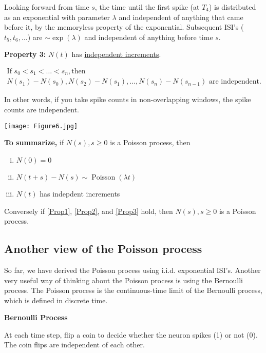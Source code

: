 \documentclass[11pt]{article}
\DeclareMathOperator{\Poisson}{Poisson}
\newenvironment{propertybox}{%
   \def\FrameCommand{\colorbox{LightSteelBlue}}%
   \MakeFramed{\advance\hsize-\width \FrameRestore}}
 {\endMakeFramed}
\begin{document}
Looking forward from time $s$, the time until the first spike (at $T_4$) is distributed as an exponential with parameter $\lambda$
and independent of anything that came before it, by the memoryless property of the exponential. Subsequent ISI's
($t_5, t_6, \ldots$) are $\sim \exp (\lambda)$ and independent of anything before time $s$.

\begin{propertybox}
{\bf Property 3:} $N(t)$ has \underline{independent increments}.
\end{propertybox}

\begin{multline*}
\text{If } s_0 < s_1 < \ldots < s_n, \text{then} \\
N(s_1) - N(s_0), N(s_2) - N(s_1), \ldots, N(s_n) - N(s_{n-1})
\text{ are independent}.
\end{multline*}

In other words, if you take spike counts in non-overlapping windows, the spike counts are independent.

\begin{center}
\texttt{[image: Figure6.jpg]}
\end{center}

\begin{propertybox}
{\bf To summarize,} if $N(s), s\geq0$ is a Poisson process, then
\begin{enumerate}[(i)]
\item \label{Prop1} $N(0) = 0$
\item \label{Prop2} $N(t + s) - N(s) \sim \Poisson(\lambda t)$
\item \label{Prop3} $N(t)$ has indepdent increments
\end{enumerate}
Conversely if \ref{Prop1}, \ref{Prop2}, and \ref{Prop3} hold, then $N(s), s\geq0$ is a Poisson process.
\end{propertybox}

\subsection{Another view of the Poisson process}
So far, we have derived the Poisson process using i.i.d. exponential ISI's. Another very useful way of thinking about
the Poisson process is using the Bernoulli process. The Poisson process is the continuous-time limit of the Bernoulli
process, which is defined in discrete time.

{\bf Bernoulli Process}

At each time step, flip a coin to decide whether the neuron spikes (1) or not (0). The coin flips are independent of each
other.
\end{document}
